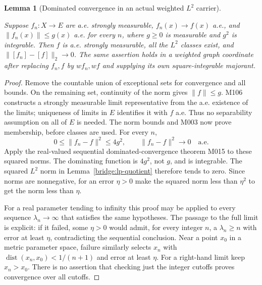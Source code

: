 \documentclass[11pt,a4paper]{article}
\newtheorem{lemma}[theorem]{Lemma}
\theoremstyle{definition}
\theoremstyle{remark}
\newcommand{\proofid}[1]{\par\smallskip{\normalfont\scriptsize\color{inkblue}Stable ID: \nolinkurl{#1}}\par\smallskip}
\begin{document}
\begin{lemma}[Dominated convergence in an actual weighted $L^2$ carrier]
\label{bridge:l2-domination}
\proofid{bridge:l2-domination}
\par{}\par\smallskip
Suppose $f_n:X\to E$ are a.e. strongly measurable,
$f_n(x)\to f(x)$ a.e., and $\|f_n(x)\|\leq g(x)$ a.e. for every $n$,
where $g\geq0$ is measurable and $g^2$ is integrable.
Then $f$ is a.e. strongly measurable, all the $L^2$ classes exist, and
$\|[f_n]-[f]\|_2\to0$. The same assertion holds in a weighted graph
coordinate after replacing $f_n,f$ by $wf_n,wf$ and supplying its own
square-integrable majorant.
\end{lemma}
\begin{proof}
Remove the countable union of exceptional sets for convergence and all
bounds. On the remaining set, continuity of the norm gives $\|f\|\leq g$.
M106 constructs a strongly measurable limit representative from the
a.e. existence of the limits; uniqueness of limits in $E$ identifies it
with $f$ a.e. Thus no separability assumption on all of $E$ is needed.
The norm bounds and M003 now prove membership, before classes are used.
For every $n$,
\[
 0\leq\|f_n-f\|^2\leq4g^2,\qquad \|f_n-f\|^2\longrightarrow0
 \quad\text{a.e.}
\]
Apply the real-valued sequential dominated-convergence theorem M015 to
these squared norms. The dominating function is $4g^2$, not $g$, and is
integrable. The squared $L^2$ norm in
Lemma~\ref{bridge:lp-quotient} therefore tends to zero. Since norms are
nonnegative, for an error $\eta>0$ make the squared norm less than
$\eta^2$ to get the norm less than $\eta$.

For a real parameter tending to infinity this proof may be applied to
every sequence $\lambda_n\to\infty$ that satisfies the same hypotheses.
The passage to the full limit is explicit: if it failed, some $\eta>0$
would admit, for every integer $n$, a $\lambda_n\geq n$ with error at
least $\eta$, contradicting the sequential conclusion. Near a point
$x_0$ in a metric parameter space, failure similarly selects $x_n$ with
$\operatorname{dist}(x_n,x_0)<1/(n+1)$ and error at least $\eta$.
For a right-hand limit keep $x_n>x_0$. There is no assertion that
checking just the integer cutoffs proves convergence over all cutoffs.
\end{proof}
\end{document}
